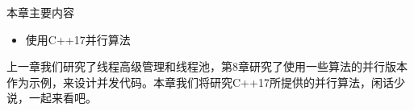 
本章主要内容
\begin{itemize}
    \item 使用C++17并行算法
\end{itemize}

上一章我们研究了线程高级管理和线程池，第8章研究了使用一些算法的并行版本作为示例，来设计并发代码。本章我们将研究C++17所提供的并行算法，闲话少说，一起来看吧。